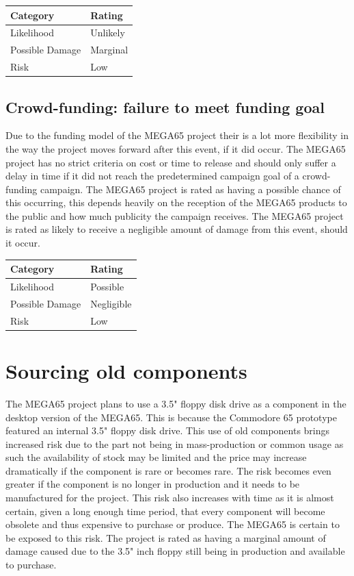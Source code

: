 \begin{tabular}{l|l} %
    	\textbf{Category} 	&	\textbf{Rating} \\
      \hline
     Likelihood			&	Unlikely \\
     Possible Damage 	& 	Marginal \\
     Risk 				&	Low		\\	
    \end{tabular}


\subsection{Crowd-funding: failure to meet funding goal}
Due to the funding model of the MEGA65 project their is a lot more flexibility in the way the project moves forward after this event, if it did occur. The MEGA65 project has no strict criteria on cost or time to release and should only suffer a delay in time if it did not reach the predetermined campaign goal of a crowd-funding campaign. The MEGA65 project is rated as having a possible chance of this occurring, this depends heavily on the reception of the MEGA65 products to the public and how much publicity the campaign receives. The MEGA65 project is rated as likely to receive a negligible amount of damage from this event, should it occur. \\

\begin{tabular}{l|l} %
    	\textbf{Category} 	&	\textbf{Rating} \\
      \hline
     Likelihood			&	Possible \\
     Possible Damage 	& 	Negligible \\
     Risk 				&	Low		\\	
    \end{tabular}


\section{Sourcing old components}
The MEGA65 project plans to use a 3.5" floppy disk drive as a component in the desktop version of the MEGA65. This is because the Commodore 65 prototype featured an internal 3.5" floppy disk drive. This use of old components brings increased risk due to the part not being in mass-production or common usage as such the availability of stock may be limited and the price may increase dramatically if the component is rare or becomes rare. The risk becomes even greater if the component is no longer in production and it needs to be manufactured for the project. This risk also increases with time as it is almost certain, given a long enough time period, that every component will become obsolete and thus expensive to purchase or produce. The MEGA65 is certain to be exposed to this risk. The project is rated as having a marginal amount of damage caused due to the 3.5" inch floppy still being in production and available to purchase. \\

